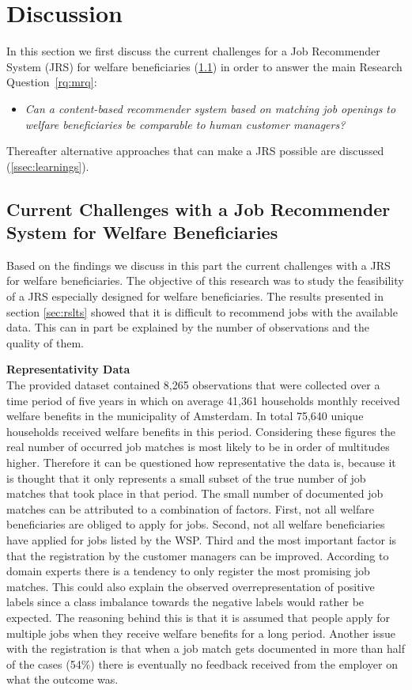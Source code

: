 \section{Discussion}
\label{sec:disc}
In this section we first discuss the current challenges for a Job Recommender System (JRS) for 
welfare beneficiaries (\ref{ssec:jrswb}) in order to answer the main Research Question~\ref{rq:mrq}: 
\begin{itemize}
	\item[] \em Can a content-based recommender system based on matching job openings to welfare beneficiaries be comparable to human customer managers?
\end{itemize}
Thereafter alternative approaches that can make a JRS possible are discussed (\ref{ssec:learnings}). 

\subsection{Current Challenges with a Job Recommender System for Welfare Beneficiaries}
\label{ssec:jrswb}
Based on the findings we discuss in this part the current challenges with a JRS for welfare beneficiaries.
The objective of this research was to study the feasibility of a JRS especially designed for welfare beneficiaries. 
The results presented in section \ref{sec:rslts} showed that it is difficult to recommend jobs with the available data.
This can in part be explained by the number of observations and the quality of them.

\noindent
\textbf{Representativity Data}\\
The provided dataset contained 8,265 observations that were collected over a time period of five years in which on average 41,361 households monthly received welfare benefits in the municipality of Amsterdam.
In total 75,640 unique households received welfare benefits in this period.
Considering these figures the real number of occurred job matches is most likely to be in order of multitudes higher.
Therefore it can be questioned how representative the data is, because it is thought that it only represents a small subset of the true number of job matches that took place in that period.  
The small number of documented job matches can be attributed to a combination of factors.
First, not all welfare beneficiaries are obliged to apply for jobs.
Second, not all welfare beneficiaries have applied for jobs listed by the WSP.
Third and the most important factor is that the registration by the customer managers can be improved.
According to domain experts there is a tendency to only register the most promising job matches.
This could also explain the observed overrepresentation of positive labels since a class imbalance towards the negative labels would rather be expected.
The reasoning behind this is that it is assumed that people apply for multiple jobs when they receive welfare benefits for a long period. 
Another issue with the registration is that when a job match gets documented in more than half of the cases (54\%) there is eventually no feedback received from the employer on what the outcome was.

